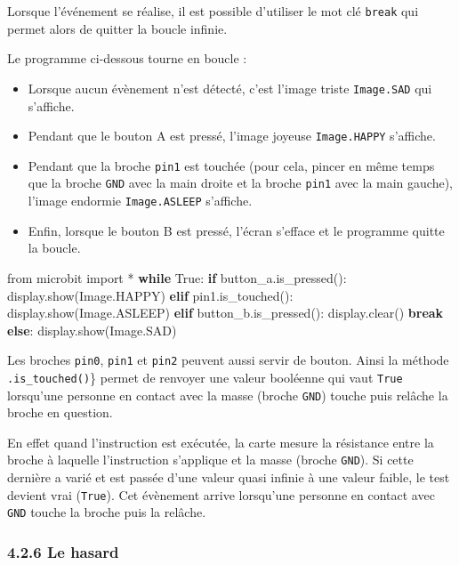 \documentclass[a4paper,17pt]{extarticle}
\providecommand{\tightlist}{%
      \setlength{\itemsep}{0pt}\setlength{\parskip}{0pt}}
\newenvironment{Shaded}{}{}
\newcommand{\NormalTok}[1]{{#1}}
\newcommand{\ImportTok}[1]{{#1}}
\newcommand{\VariableTok}[1]{\textcolor[rgb]{0.10,0.09,0.49}{{#1}}}
\newcommand{\ControlFlowTok}[1]{\textcolor[rgb]{0.00,0.44,0.13}{\textbf{{#1}}}}
\newcommand{\OperatorTok}[1]{\textcolor[rgb]{0.40,0.40,0.40}{{#1}}}
\begin{document}
Lorsque l'événement se réalise, il est possible d'utiliser le mot clé
\texttt{break} qui permet alors de quitter la boucle infinie.
\begin{exemple}
    Le programme ci-dessous tourne en boucle :

\begin{itemize}
\tightlist
\item
  Lorsque aucun évènement n'est détecté, c'est l'image triste
  \texttt{Image.SAD} qui s'affiche.
\item
  Pendant que le bouton A est pressé, l'image joyeuse
  \texttt{Image.HAPPY} s'affiche.
\item
  Pendant que la broche \texttt{pin1} est touchée (pour cela, pincer en
  même temps que la broche \texttt{GND} avec la main droite et la broche
  \texttt{pin1} avec la main gauche), l'image endormie
  \texttt{Image.ASLEEP} s'affiche.
\item
  Enfin, lorsque le bouton B est pressé, l'écran s'efface et le
  programme quitte la boucle.
\end{itemize}

\begin{Shaded}
\begin{Highlighting}[]
\ImportTok{from}\NormalTok{ microbit }\ImportTok{import} \OperatorTok{*}
\ControlFlowTok{while} \VariableTok{True}\NormalTok{:}
    \ControlFlowTok{if}\NormalTok{ button\_a.is\_pressed():}
\NormalTok{        display.show(Image.HAPPY)}
    \ControlFlowTok{elif}\NormalTok{ pin1.is\_touched():}
\NormalTok{        display.show(Image.ASLEEP)}
    \ControlFlowTok{elif}\NormalTok{ button\_b.is\_pressed():}
\NormalTok{        display.clear()}
        \ControlFlowTok{break}
    \ControlFlowTok{else}\NormalTok{:}
\NormalTok{        display.show(Image.SAD)}
\end{Highlighting}
\end{Shaded}

        \end{exemple}\begin{remarque}
    Les broches \texttt{pin0}, \texttt{pin1} et \texttt{pin2} peuvent aussi
servir de bouton. Ainsi la méthode \texttt{.is\_touched()}\} permet de
renvoyer une valeur booléenne qui vaut \texttt{True} lorsqu'une personne
en contact avec la masse (broche \texttt{GND}) touche puis relâche la
broche en question.

En effet quand l'instruction est exécutée, la carte mesure la résistance
entre la broche à laquelle l'instruction s'applique et la masse (broche
\texttt{GND}). Si cette dernière a varié et est passée d'une valeur
quasi infinie à une valeur faible, le test devient vrai (\texttt{True}).
Cet évènement arrive lorsqu'une personne en contact avec \texttt{GND}
touche la broche puis la relâche.

        \end{remarque}
    \hypertarget{le-hasard}{%
\subsubsection{4.2.6 Le hasard}\label{le-hasard}}
\end{document}
